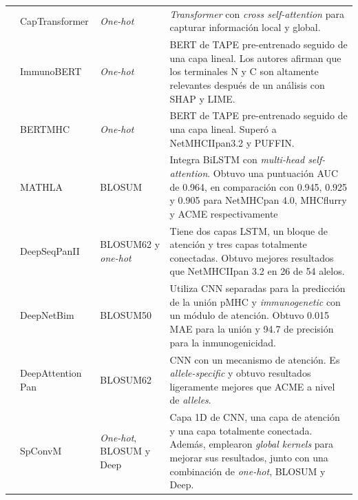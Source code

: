 \begin{table}[ht]
{\begin{scriptsize}
\begin{tabular}{p{2.5cm}p{2.5cm}p{2cm}p{6.2cm}}
			\cite{chen2021jointly}  & CapTransformer            & \textit{One-hot}   &  \textit{Transformer} con \textit{cross self-attention} para capturar información local y global.  \\
			
			\cite{gasser2021interpreting}  & ImmunoBERT            & \textit{One-hot}                     & BERT de TAPE pre-entrenado seguido de una capa lineal. Los autores afirman que los terminales N y C son altamente relevantes después de un análisis con SHAP y LIME.   \\
			
			\cite{cheng2021bertmhc}             & BERTMHC              & \textit{One-hot}                    & BERT de TAPE pre-entrenado seguido de una capa lineal. Superó a NetMHCIIpan3.2 y PUFFIN.   \\
			
			\cite{ye2021mathla}         & MATHLA             & BLOSUM                      & 
			Integra BiLSTM con \textit{multi-head self-attention}. Obtuvo una puntuación AUC de 0.964, en comparación con 0.945, 0.925 y 0.905 para NetMHCpan 4.0, MHCflurry y ACME respectivamente  \\
			
			\cite{liu2021deepseqpanii}                    & DeepSeqPanII                            & BLOSUM62 y \textit{one-hot}& Tiene dos capas LSTM, un bloque de atención y tres capas totalmente conectadas. Obtuvo mejores resultados que NetMHCIIpan 3.2 en 26 de 54 alelos.       \\
			
			\cite{yang2021deepnetbim}  & DeepNetBim               & BLOSUM50            & Utiliza CNN separadas para la predicción de la unión pMHC y \textit{immunogenetic} con un módulo de atención. Obtuvo 0.015 MAE para la unión y 94.7 de precisión para la inmunogenicidad.      \\
			
			\cite{jin2021deep}         & DeepAttention Pan        & BLOSUM62            & CNN con un mecanismo de atención. Es \textit{allele-specific} y obtuvo resultados ligeramente mejores que ACME a nivel de \textit{alleles}.     \\
			
			\cite{chen2021ranking}  & SpConvM            &  \textit{One-hot}, BLOSUM y Deep                     &  Capa 1D de CNN, una capa de atención y una capa totalmente conectada. Además, emplearon \textit{global kernels} para mejorar sus resultados, junto con una combinación de \textit{one-hot}, BLOSUM y Deep.  \\
			

\end{tabular}
\end{scriptsize}}
\end{table}
